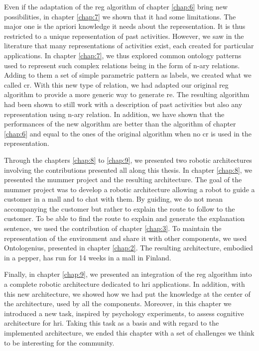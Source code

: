 Even if the adaptation of the \acrshort{reg} algorithm of chapter \ref{chap:6} bring new possibilities, in chapter \ref{chap:7} we shown that it had some limitations. The major one is the apriori knowledge it needs about the representation. It is thus restricted to a unique representation of past activities. However, we saw in the literature that many representations of activities exist, each created for particular applications. In chapter \ref{chap:7}, we thus explored common ontology patterns used to represent such complex relations being in the form of n-ary relations. Adding to them a set of simple parametric pattern as labels, we created what we called \acrfull{cr}. With this new type of relation, we had adapted our original \acrshort{reg} algorithm to provide a more generic way to generate \acrshort{re}. The resulting algorithm had been shown to still work with a description of past activities but also any representation using n-ary relation. In addition, we have shown that the performances of the new algorithm are better than the algorithm of chapter \ref{chap:6} and equal to the ones of the original algorithm when no \acrshort{cr} is used in the representation.

Through the chapters \ref{chap:8} to \ref{chap:9}, we presented two robotic architectures involving the contributions presented all along this thesis. In chapter \ref{chap:8}, we presented the \acrfull{mummer} project and the resulting architecture. The goal of the \acrshort{mummer} project was to develop a robotic architecture allowing a robot to guide a customer in a mall and to chat with them. By guiding, we do not mean accompanying the customer but rather to explain the route to follow to the customer. To be able to find the route to explain and generate the explanation sentence, we used the contribution of chapter \ref{chap:3}. To maintain the representation of the environment and share it with other components, we used Ontologenius, presented in chapter \ref{chap:2}. The resulting architecture, embodied in a pepper, has run for 14 weeks in a mall in Finland.

Finally, in chapter \ref{chap:9}, we presented an integration of the \acrshort{reg} algorithm into a complete robotic architecture dedicated to \acrshort{hri} applications. In addition, with this new architecture, we showed how we had put the knowledge at the center of the architecture, used by all the components. Moreover, in this chapter we introduced a new task, inspired by psychology experiments, to assess cognitive architecture for \acrshort{hri}. Taking this task as a basis and with regard to the implemented architecture, we ended this chapter with a set of challenges we think to be interesting for the community.

